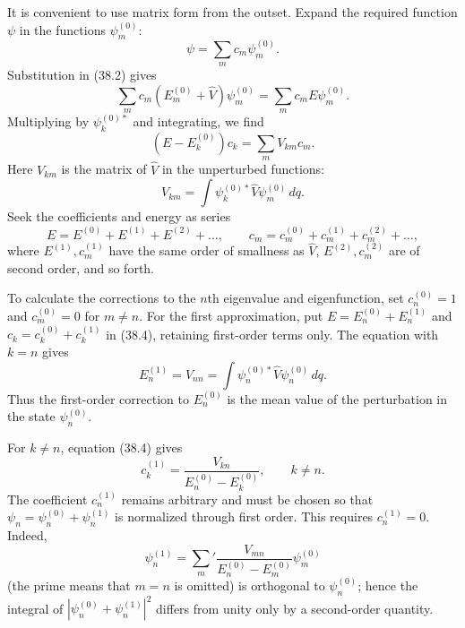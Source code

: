 It is convenient to use matrix form from the outset. Expand the required
function $\psi$ in the functions $\psi_m^{(0)}$:
\begin{equation}
  \psi=\sum_m c_m\psi_m^{(0)}.
  \tag{38.3}
\end{equation}
Substitution in (38.2) gives
\[
  \sum_m c_m(E_m^{(0)}+\hat V)\psi_m^{(0)}
  =\sum_m c_mE\psi_m^{(0)}.
\]
Multiplying by $\psi_k^{(0)*}$ and integrating, we find
\begin{equation}
  (E-E_k^{(0)})c_k=\sum_mV_{km}c_m.
  \tag{38.4}
\end{equation}
Here $V_{km}$ is the matrix of $\hat V$ in the unperturbed functions:
\begin{equation}
  V_{km}=\int\psi_k^{(0)*}\hat V\psi_m^{(0)}\,dq.
  \tag{38.5}
\end{equation}
Seek the coefficients and energy as series
\[
  E=E^{(0)}+E^{(1)}+E^{(2)}+\ldots,\qquad
  c_m=c_m^{(0)}+c_m^{(1)}+c_m^{(2)}+\ldots,
\]
where $E^{(1)},c_m^{(1)}$ have the same order of smallness as $\hat V$,
$E^{(2)},c_m^{(2)}$ are of second order, and so forth.

To calculate the corrections to the $n$th eigenvalue and eigenfunction, set
$c_n^{(0)}=1$ and $c_m^{(0)}=0$ for $m\ne n$. For the first approximation,
put $E=E_n^{(0)}+E_n^{(1)}$ and
$c_k=c_k^{(0)}+c_k^{(1)}$ in (38.4), retaining first-order terms only. The
equation with $k=n$ gives
\begin{equation}
  E_n^{(1)}=V_{nn}=\int\psi_n^{(0)*}\hat V\psi_n^{(0)}\,dq.
  \tag{38.6}
\end{equation}
Thus the first-order correction to $E_n^{(0)}$ is the mean value of the
perturbation in the state $\psi_n^{(0)}$.

For $k\ne n$, equation (38.4) gives
\begin{equation}
  c_k^{(1)}=\frac{V_{kn}}{E_n^{(0)}-E_k^{(0)}},\qquad k\ne n.
  \tag{38.7}
\end{equation}
The coefficient $c_n^{(1)}$ remains arbitrary and must be chosen so that
$\psi_n=\psi_n^{(0)}+\psi_n^{(1)}$ is normalized through first order. This
requires $c_n^{(1)}=0$. Indeed,
\begin{equation}
  \psi_n^{(1)}=\sum_m'\frac{V_{mn}}{E_n^{(0)}-E_m^{(0)}}\psi_m^{(0)}
  \tag{38.8}
\end{equation}
(the prime means that $m=n$ is omitted) is orthogonal to $\psi_n^{(0)}$;
hence the integral of $|\psi_n^{(0)}+\psi_n^{(1)}|^2$ differs from unity only
by a second-order quantity.

